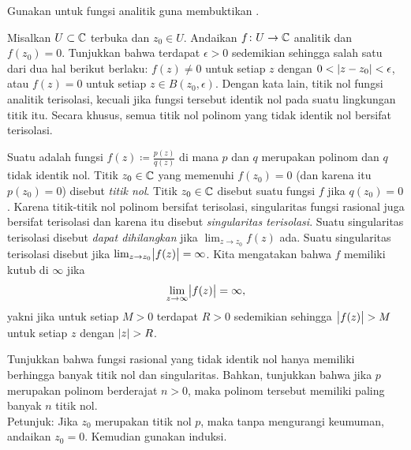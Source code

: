 \begin{exercise} \label{exercise:maxprinciple}
Gunakan  untuk fungsi analitik guna membuktikan .
\end{exercise}

\begin{exercise}
Misalkan $U \subset {\mathbb{C}}$ terbuka dan $z_0 \in U$.
Andaikan $f \colon U \to {\mathbb{C}}$ analitik dan $f(z_0) = 0$.  Tunjukkan bahwa
terdapat $\epsilon > 0$ sedemikian sehingga salah satu dari dua hal berikut berlaku:
$f(z) \neq 0$ untuk setiap $z$ dengan $0 < \lvert {z-z_0} \rvert < \epsilon$,
atau $f(z) = 0$ untuk setiap $z \in B(z_0,\epsilon)$.
Dengan kata lain, titik nol fungsi analitik terisolasi, kecuali jika fungsi tersebut identik
nol pada suatu lingkungan titik itu.  Secara khusus, semua titik nol polinom yang tidak identik nol bersifat terisolasi.
\end{exercise}

\begin{exnote}
\pagebreak[1]
Suatu \emph{} adalah fungsi
$f(z) \coloneqq \frac{p(z)}{q(z)}$
di mana $p$ dan $q$ merupakan polinom dan $q$ tidak identik nol.
Titik $z_0 \in {\mathbb{C}}$ yang memenuhi $f(z_0) = 0$ (dan karena itu $p(z_0) = 0$)
disebut \emph{titik nol}.
Titik $z_0 \in {\mathbb{C}}$ disebut suatu \emph{} fungsi
$f$ jika $q(z_0) = 0$.  Karena titik-titik nol polinom bersifat terisolasi,
singularitas fungsi rasional juga bersifat terisolasi
dan karena itu disebut
\emph{singularitas terisolasi}.
Suatu singularitas terisolasi disebut
\emph{dapat dihilangkan}
jika $\lim_{z \to z_0} f(z)$ ada.
Suatu singularitas terisolasi disebut \emph{} jika 
$\lim_{z \to z_0} \bigl\lvert {f(z)} \bigr\rvert = \infty$.
Kita mengatakan bahwa $f$ memiliki kutub di $\infty$ jika
\begin{equation*}
\lim_{z \to \infty} \bigl\lvert {f(z)} \bigr\rvert = \infty ,
\end{equation*}
yakni jika untuk setiap $M > 0$ terdapat $R > 0$ sedemikian sehingga
$\bigl\lvert {f(z)} \bigr\rvert > M$ untuk setiap $z$ dengan $\lvert {z} \rvert > R$.
\end{exnote}

\begin{exercise}
Tunjukkan bahwa fungsi rasional yang tidak identik
nol hanya memiliki berhingga banyak titik nol dan
singularitas.  Bahkan, tunjukkan bahwa jika $p$ merupakan polinom
berderajat $n > 0$, maka polinom tersebut memiliki paling banyak $n$ titik nol.
\\
Petunjuk: Jika $z_0$ merupakan titik nol $p$, maka tanpa mengurangi keumuman, andaikan $z_0 =
0$.  Kemudian gunakan induksi.
\end{exercise}

